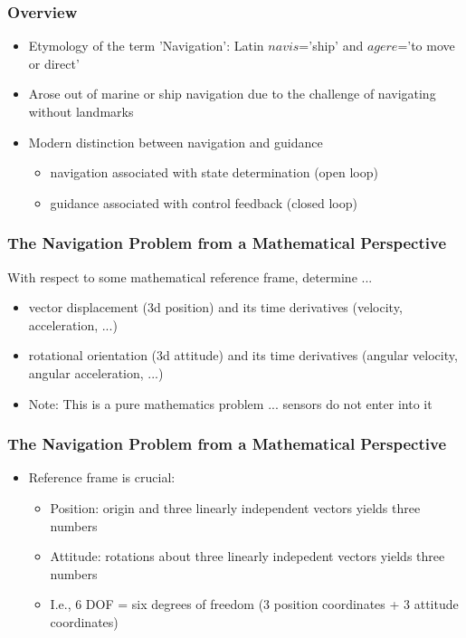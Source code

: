 \begin{frame}
\frametitle{Overview}
\begin{itemize}
  \item Etymology of the term 'Navigation':  Latin $navis$='ship' and $agere$='to move or direct'
  \item Arose out of marine or ship navigation due to the challenge of navigating without landmarks
  \item Modern distinction between navigation and guidance
  \begin{itemize}
    \item navigation associated with state determination (open loop)
    \item guidance associated with control feedback (closed loop)
  \end{itemize} 
\end{itemize} 
\end{frame}

\begin{frame}
  \frametitle{The Navigation Problem from a Mathematical Perspective}
With respect to some mathematical reference frame, determine ...
\begin{itemize}
  \item vector displacement (3d position) and its time derivatives (velocity, acceleration, ...)
  \item rotational orientation (3d attitude) and its time derivatives (angular velocity, angular acceleration, ...) 
  \item Note:  This is a pure mathematics problem ... sensors do not enter into it
\end{itemize} 
\end{frame}


\begin{frame}
  \frametitle{The Navigation Problem from a Mathematical Perspective}
\begin{itemize}
  \item Reference frame is crucial:
  \begin{itemize}
    \item Position:  origin and three linearly independent vectors yields three numbers
    \item Attitude:  rotations about three linearly indepedent vectors yields three numbers
  \item I.e., 6 DOF = six degrees of freedom (3 position coordinates + 3 attitude coordinates)
  \end{itemize}
\end{itemize} 
\end{frame}


